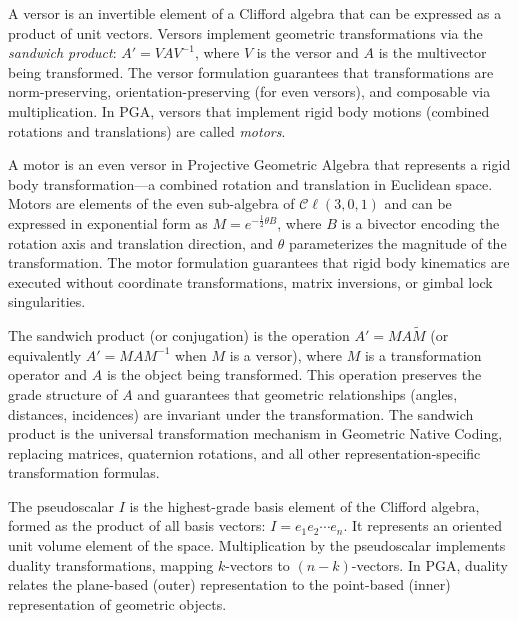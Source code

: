 \documentclass[manuscript, nonacm, review=false]{acmart}
\theoremstyle{definition}
\theoremstyle{plain}
\newcommand{\Cl}{\mathcal{C}\!\ell}
\begin{document}
\begin{description}[style=unboxed, leftmargin=0cm, font=\bfseries]
\item[Versor]
A versor is an invertible element of a Clifford algebra that can be expressed as a product of unit vectors. Versors implement geometric transformations via the \emph{sandwich product}: $A' = V A V^{-1}$, where $V$ is the versor and $A$ is the multivector being transformed. The versor formulation guarantees that transformations are norm-preserving, orientation-preserving (for even versors), and composable via multiplication. In PGA, versors that implement rigid body motions (combined rotations and translations) are called \emph{motors}.

\item[Motor]
A motor is an even versor in Projective Geometric Algebra that represents a rigid body transformation---a combined rotation and translation in Euclidean space. Motors are elements of the even sub-algebra of $\Cl(3,0,1)$ and can be expressed in exponential form as $M = e^{-\frac{1}{2}\theta B}$, where $B$ is a bivector encoding the rotation axis and translation direction, and $\theta$ parameterizes the magnitude of the transformation. The motor formulation guarantees that rigid body kinematics are executed without coordinate transformations, matrix inversions, or gimbal lock singularities.

\item[Sandwich Product]
The sandwich product (or conjugation) is the operation $A' = M A \widetilde{M}$ (or equivalently $A' = M A M^{-1}$ when $M$ is a versor), where $M$ is a transformation operator and $A$ is the object being transformed. This operation preserves the grade structure of $A$ and guarantees that geometric relationships (angles, distances, incidences) are invariant under the transformation. The sandwich product is the universal transformation mechanism in Geometric Native Coding, replacing matrices, quaternion rotations, and all other representation-specific transformation formulas.

\item[Pseudoscalar]
The pseudoscalar $I$ is the highest-grade basis element of the Clifford algebra, formed as the product of all basis vectors: $I = e_1 e_2 \cdots e_n$. It represents an oriented unit volume element of the space. Multiplication by the pseudoscalar implements duality transformations, mapping $k$-vectors to $(n-k)$-vectors. In PGA, duality relates the plane-based (outer) representation to the point-based (inner) representation of geometric objects.

\end{description}
\end{document}
